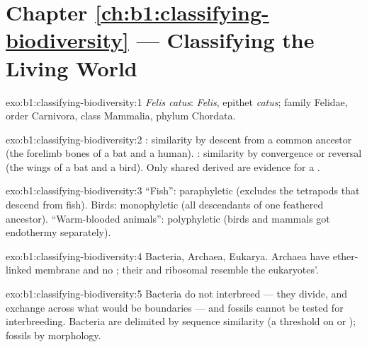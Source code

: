 \section*{Chapter \ref{ch:b1:classifying-biodiversity} --- Classifying the Living World}

\begin{solution}{exo:b1:classifying-biodiversity:1}
\emph{Felis catus}:  \emph{Felis}, epithet \emph{catus}; family
Felidae, order Carnivora, class Mammalia, phylum Chordata.
\end{solution}

\begin{solution}{exo:b1:classifying-biodiversity:2}
: similarity by descent from a common ancestor (the forelimb
bones of a bat and a human). : similarity by convergence or
reversal (the wings of a bat and a bird). Only shared derived
 are evidence for a .
\end{solution}

\begin{solution}{exo:b1:classifying-biodiversity:3}
``Fish'': paraphyletic (excludes the tetrapods that descend from
fish). Birds: monophyletic (all descendants of one feathered
ancestor). ``Warm-blooded animals'': polyphyletic (birds and mammals
got endothermy separately).
\end{solution}

\begin{solution}{exo:b1:classifying-biodiversity:4}
Bacteria, Archaea, Eukarya. Archaea have ether-linked membrane
 and no ; their  and ribosomal
 resemble the eukaryotes'.
\end{solution}

\begin{solution}{exo:b1:classifying-biodiversity:5}
Bacteria do not interbreed --- they divide, and exchange  across
what would be  boundaries --- and fossils cannot be tested for
interbreeding. Bacteria are delimited by sequence similarity (a
threshold on  or ); fossils by morphology.
\end{solution}


